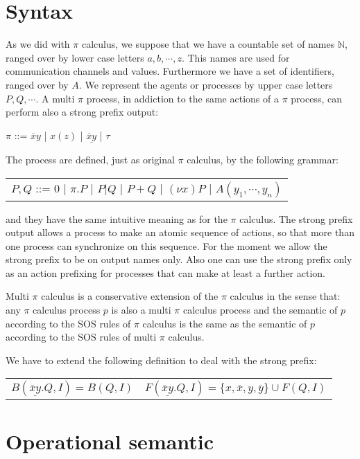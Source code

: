 
\section{Syntax}
As we did with $\pi$ calculus, we suppose that we have a countable set of names $\mathbb{N}$, ranged over by lower case letters $a,b, \cdots, z$. This names are used for communication channels and values. Furthermore we have a set of identifiers, ranged over by $A$. We represent the agents or processes by upper case letters $P,Q, \cdots $. A multi $\pi$ process, in addiction to the same actions of a $\pi$ process, can perform also a strong prefix output:
\begin{center}
  $\pi$ ::= $\overline{x}y$ | $x(z)$ | $\underline{\overline{x}y}$ | $\tau$ 
\end{center}
The process are defined, just as original $\pi$ calculus, by the following grammar:
\begin{center}
  \begin{tabular}{l}
    $P,Q$ ::= $0$ | $\pi.P$ | $P|Q$ | $P+Q$ | $(\nu x) P$ | $A(y_{1}, \cdots, y_{n})$
  \end{tabular}
\end{center}
and they have the same intuitive meaning as for the $\pi$ calculus. The strong prefix output allows a process to make an atomic sequence of actions, so that more than one process can synchronize on this sequence. For the moment we allow the strong prefix to be on output names only. Also one can use the strong prefix only as an action prefixing for processes that can make at least a further action. 

Multi $\pi$ calculus is a conservative extension of the $\pi$ calculus in the sense that: any $\pi$ calculus process $p$ is also a multi $\pi$ calculus process and the semantic of $p$ according to the SOS rules of $\pi$ calculus is the same as the semantic of $p$ according to the SOS rules of multi $\pi$ calculus. 

We have to extend the following definition to deal with the strong prefix:
\begin{center}
  \begin{tabular}{ll}
	$B(\underline{\overline{x}y}.Q, I) = B(Q,I)$
      &
	$F(\underline{\overline{x}y}.Q, I) = \{x,\overline{x},y,\overline{y}\}\cup F(Q, I)$
    \\
  \end{tabular}
\end{center}


\section{Operational semantic}
